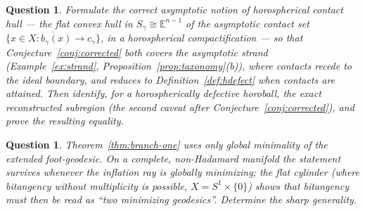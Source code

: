 \documentclass[11pt]{article}
\newtheorem{question}[theorem]{Question}
\theoremstyle{remark}
\newcommand{\X}{X}
\newcommand{\Sb}[1]{S_{#1}}
\begin{document}
\begin{question}\label{q:asymptotic}
Formulate the correct asymptotic notion of horospherical contact
hull --- the flat convex hull in $\Sb{\gamma}\cong\mathbb{E}^{n-1}$ of
the \emph{asymptotic} contact set
$\overline{\{x\in\X:b_{\gamma}(x)\to c_{\gamma}\}}$, in a horospherical
compactification --- so that Conjecture~\ref{conj:corrected} both
covers the asymptotic strand (Example~\ref{ex:strand},
Proposition~\ref{prop:taxonomy}(b)), where contacts recede to the
ideal boundary, and reduces to Definition~\ref{def:hdefect} when
contacts are attained. Then identify, for a horospherically
defective horoball, the exact reconstructed subregion (the second
caveat after Conjecture~\ref{conj:corrected}), and prove the
resulting equality.
\end{question}

\begin{question}\label{q:positive-curv}
Theorem~\ref{thm:branch-one} uses only global minimality of the
extended foot-geodesic. On a complete, non-Hadamard manifold the
statement survives whenever the inflation ray is globally minimizing;
the flat cylinder (where bitangency without multiplicity is possible,
$\X=S^{1}\times\{0\}$) shows that bitangency must then be read as
``two minimizing geodesics''. Determine the sharp generality.
\end{question}
\end{document}
